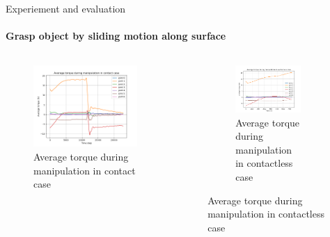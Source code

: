 \documentclass[aspectratio=169]{beamer}
\begin{document}
  \begin{frame}{Experiement and evaluation}
    \framesubtitle{Grasp object by sliding motion along surface}
    \vspace{-5mm}
    \begin{columns}[c]
      \begin{column}{.5\textwidth}
        \begin{figure}
        \includegraphics[width=1\textwidth]{images/us1_con_tor.png}
        \caption{Average torque during manipulation in contact case}
      \end{figure}
      \end{column}
      \begin{column}{.5\textwidth}
      \begin{figure}
        \centering
        \begin{figure}
          \includegraphics[width=1\textwidth]{images/us1_conless_tor.png}
          \caption{Average torque during manipulation in contactless case}
        \end{figure}
      \end{figure}
      \end{column}
      \end{columns}
  \end{frame}
\end{document}
